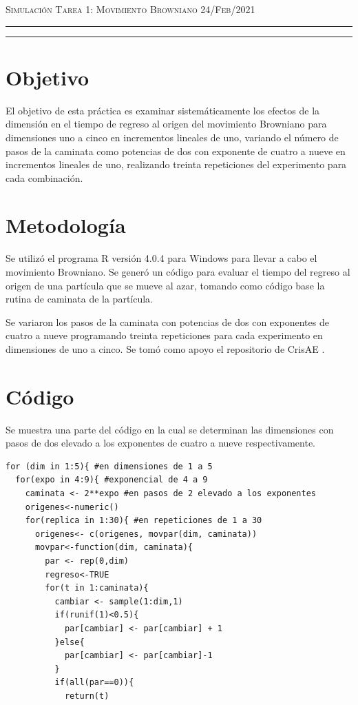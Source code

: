 \documentclass[12pt]{amsart}
\begin{document}
\pagestyle{empty}



\thispagestyle{empty}

{\scshape Simulación} \hfill {\scshape \Large Tarea 1: Movimiento Browniano} \hfill  {\scshape 24/Feb/2021}
\author{C. María Montemayor Palos}
\maketitle

\hrule
\hrule
\bigskip


\section{Objetivo}
El objetivo de esta práctica es examinar sistemáticamente los efectos de la dimensión en el tiempo de regreso al origen del movimiento Browniano para dimensiones uno a cinco en incrementos lineales de uno, variando el número de pasos de la caminata como potencias de dos con exponente de cuatro a nueve en incrementos lineales de uno, realizando treinta repeticiones del experimento para cada combinación.

\section{Metodología}
Se utilizó el programa R versión 4.0.4 \cite{R} para Windows para llevar a cabo el movimiento Browniano. Se generó un código para evaluar el tiempo del regreso al origen de una partícula que se mueve al azar, tomando como código base la rutina de caminata \cite{Dra.Elisa} de la partícula.

Se variaron los pasos de la caminata con potencias de dos con exponentes de cuatro a nueve programando treinta repeticiones para cada experimento en dimensiones de uno a cinco. Se tomó como apoyo el repositorio de CrisAE \cite{CrisAE}.

\section{Código}
Se muestra una parte del código en la cual se determinan las dimensiones con pasos de dos elevado a los exponentes de cuatro a nueve respectivamente.
\begin{lstlisting}
for (dim in 1:5){ #en dimensiones de 1 a 5
  for(expo in 4:9){ #exponencial de 4 a 9
    caminata <- 2**expo #en pasos de 2 elevado a los exponentes
    origenes<-numeric()
    for(replica in 1:30){ #en repeticiones de 1 a 30
      origenes<- c(origenes, movpar(dim, caminata))
      movpar<-function(dim, caminata){
        par <- rep(0,dim)
        regreso<-TRUE
        for(t in 1:caminata){
          cambiar <- sample(1:dim,1)
          if(runif(1)<0.5){
            par[cambiar] <- par[cambiar] + 1
          }else{
            par[cambiar] <- par[cambiar]-1
          }
          if(all(par==0)){
            return(t)


\end{lstlisting}
\end{document}

